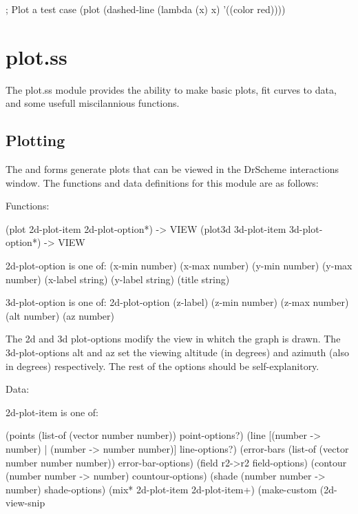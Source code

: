 \documentclass{article}
\begin{document}
{{{\begin{schemedisplay}
; Plot a test case
(plot (dashed-line (lambda (x) x) '((color red))))
\end{schemedisplay}

\pagebreak

\section{plot.ss}


The plot.ss module provides the ability to make basic plots, fit curves to data, and some usefull miscilannious functions.

\subsection{Plotting}


The  and  forms generate plots that can be viewed in the DrScheme interactions window. The functions and data definitions for this  module are as follows:



\begin{schemedisplay}

       
Functions:
       
 (plot 2d-plot-item 2d-plot-option*) -> VIEW
 (plot3d 3d-plot-item 3d-plot-option*) -> VIEW
     
2d-plot-option is one of:
 (x-min number)
 (x-max number)
 (y-min number)
 (y-max number)
 (x-label string)
 (y-label string)
 (title string)
     
3d-plot-option is one of:
 2d-plot-option
 (z-label)
 (z-min number)
 (z-max number)
 (alt number)
 (az number) 
     
\end{schemedisplay}



The 2d and 3d plot-options modify the view in whitch the graph is drawn. The 3d-plot-options alt and az set the viewing altitude (in degrees) and azimuth (also in degrees) respectively. The rest of the options should be self-explanitory.



\begin{schemedisplay}

Data:
     
2d-plot-item is one of:

 (points (list-of (vector number number)) point-options?)
 (line [(number -> number) | (number -> number number)] line-options?)
 (error-bars (list-of (vector number number number)) error-bar-options)
 (field r2->r2 field-options)
 (contour (number number -> number) countour-options)
 (shade (number number -> number) shade-options)
 (mix* 2d-plot-item 2d-plot-item+)
 (make-custom (2d-view-snip%
     

\end{schemedisplay}}}}
\end{document}
